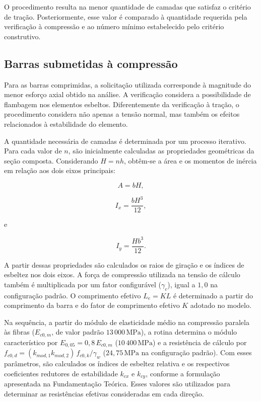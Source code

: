 O procedimento resulta na menor quantidade de camadas que satisfaz o critério de tração. Posteriormente, esse valor é comparado à quantidade requerida pela verificação à compressão e ao número mínimo estabelecido pelo critério construtivo.

\subsection{Barras submetidas à compressão}
\label{subsec:metodologia-compressao}

Para as barras comprimidas, a solicitação utilizada corresponde à magnitude do menor esforço axial obtido na análise. A verificação considera a possibilidade de flambagem nos elementos esbeltos. Diferentemente da verificação à tração, o procedimento considera não apenas a tensão normal, mas também os efeitos relacionados à estabilidade do elemento.

A quantidade necessária de camadas é determinada por um processo iterativo. Para cada valor de \(n\), são inicialmente calculadas as propriedades geométricas da seção composta. Considerando \(H=nh\), obtêm-se a área e os momentos de inércia em relação aos dois eixos principais:

\begin{equation}
    A = bH,
\end{equation}

\begin{equation}
    I_x = \frac{bH^3}{12},
\end{equation}

e

\begin{equation}
    I_y = \frac{Hb^3}{12}.
\end{equation}

A partir dessas propriedades são calculados os raios de giração e os índices de esbeltez nos dois eixos. A força de compressão utilizada na tensão de cálculo também é multiplicada por um fator configurável (\(\gamma_c\)), igual a \(1,0\) na configuração padrão. O comprimento efetivo \(L_e = K L\) é determinado a partir do comprimento da barra e do fator de comprimento efetivo \(K\) adotado no modelo.

Na sequência, a partir do módulo de elasticidade médio na compressão paralela às fibras (\(E_{c0,m}\), de valor padrão \(13\,000\,\mathrm{MPa}\)), a rotina determina o módulo característico por \(E_{0,05} = 0,8\,E_{c0,m}\) (\(10\,400\,\mathrm{MPa}\)) e a resistência de cálculo por \(f_{c0,d} = (k_{mod,1}k_{mod,2})\,f_{c0,k}/\gamma_w\) (\(24,75\,\mathrm{MPa}\) na configuração padrão). Com esses parâmetros, são calculados os índices de esbeltez relativa e os respectivos coeficientes redutores de estabilidade \(k_{cx}\) e \(k_{cy}\), conforme a formulação apresentada na Fundamentação Teórica. Esses valores são utilizados para determinar as resistências efetivas consideradas em cada direção.

